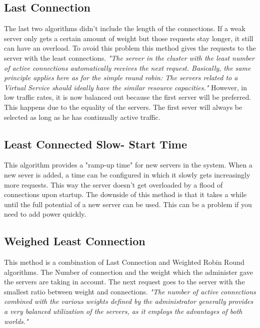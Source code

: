 \documentclass[12p]{article}
\begin{document}
	\subsection{Last Connection}
	The last two algorithms didn't include the length of the connections. If a weak server only gets a certain amount of weight but those requests stay longer, it still can have an overload. To avoid this problem this method gives the requests to the server with the least connections. \textit{"The server  in the cluster with the least number of active connections automatically receives the next  request. Basically, the same principle applies here as for the simple round robin: The servers  related to a Virtual Service should ideally have the similar resource capacities."} \cite{schedu} However, in low traffic rates, it is now balanced out because the first server will be preferred. This happens due to the equality of the servers. The first sever will always be selected as long as he has continually active traffic. 
	
	\subsection{Least Connected Slow- Start Time}
	This algorithm provides a "ramp-up time" for new servers in the system. When a new sever is added, a time can be configured in which it slowly gets increasingly more requests. This way the server doesn't get overloaded by a flood of connections upon startup. The downside of this method is that it takes a while until the full potential of a new server can be used. This can be a problem if you need to add power quickly. 
	
	\subsection{Weighed Least Connection}
	This method is a combination of Last Connection and Weighted Robin Round algorithms. The Number of connection and the weight which the administer gave the servers are taking in account. The next request goes to the server with the smallest ratio between weight and connections. \textit{"The number of active connections combined with the various weights defined by the  administrator generally provides a very balanced utilization of the servers, as it employs the  advantages of both worlds."}\cite{schedu}
	
\end{document}
